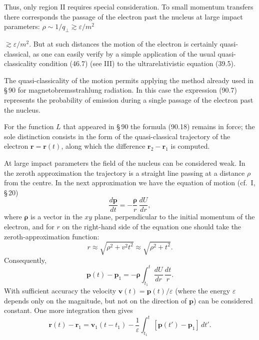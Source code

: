 Thus, only region II requires special consideration. To small momentum transfers there corresponds the passage of the electron past the nucleus at large impact parameters: $\rho \sim 1/q_\perp \gtrsim \varepsilon/m^2$


$\gtrsim \varepsilon/m^2$. But at such distances the motion of the electron is certainly quasi-classical, as one can easily verify by a simple application of the usual quasi-classicality condition (46.7) (see III) to the ultrarelativistic equation (39.5).

The quasi-classicality of the motion permits applying the method already used in \S\,90 for magnetobremsstrahlung radiation. In this case the expression (90.7) represents the probability of emission during a single passage of the electron past the nucleus.

For the function $L$ that appeared in \S\,90 the formula (90.18) remains in force; the sole distinction consists in the form of the quasi-classical trajectory of the electron $\mathbf{r} = \mathbf{r}(t)$, along which the difference $\mathbf{r}_2 - \mathbf{r}_1$ is computed.

At large impact parameters the field of the nucleus can be considered weak. In the zeroth approximation the trajectory is a straight line passing at a distance $\rho$ from the centre. In the next approximation we have the equation of motion (cf.\ I, \S\,20)
\[
\frac{d\mathbf{p}}{dt} = -\frac{\boldsymbol{\rho}}{r}\,\frac{dU}{dr},
\]
where $\boldsymbol{\rho}$ is a vector in the $xy$ plane, perpendicular to the initial momentum of the electron, and for $r$ on the right-hand side of the equation one should take the zeroth-approximation function:
\[
r \approx \sqrt{\rho^2 + v^2t^2} \approx \sqrt{\rho^2 + t^2}.
\]
Consequently,
\begin{equation}
\mathbf{p}(t) - \mathbf{p}_1 = -\boldsymbol{\rho}\int_{t_1}^{t}\frac{dU}{dr}\,\frac{dt}{r}.
\label{eq:96.3}
\end{equation}
With sufficient accuracy the velocity $\mathbf{v}(t) = \mathbf{p}(t)/\varepsilon$ (where the energy $\varepsilon$ depends only on the magnitude, but not on the direction of $\mathbf{p}$) can be considered constant. One more integration then gives
\begin{equation}
\mathbf{r}(t) - \mathbf{r}_1 = \mathbf{v}_1(t - t_1) - \frac{1}{\varepsilon}\int_{t_1}^{t}[\mathbf{p}(t') - \mathbf{p}_1]\,dt'.
\label{eq:96.4}
\end{equation}

